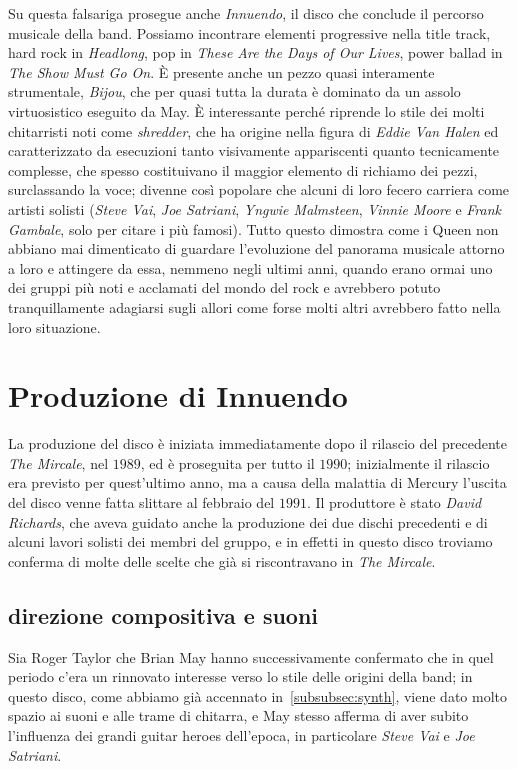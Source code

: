 \documentclass[12pt]{article}
\begin{document}
Su questa falsariga prosegue anche \emph{Innuendo}, il disco che conclude il percorso musicale della band. Possiamo incontrare elementi progressive nella title track, hard rock in \emph{Headlong}, pop in \emph{These Are the Days of Our Lives}, power ballad in \emph{The Show Must Go On}. È presente anche un pezzo quasi interamente strumentale, \emph{Bijou}, che per quasi tutta la durata è dominato da un assolo virtuosistico eseguito da May. È interessante perché riprende lo stile dei molti chitarristi noti come \emph{shredder}, che ha origine nella figura di \emph{Eddie Van Halen} ed caratterizzato da esecuzioni tanto visivamente appariscenti quanto tecnicamente complesse, che spesso costituivano il maggior elemento di richiamo dei pezzi, surclassando la voce; divenne così popolare che alcuni di loro fecero carriera come artisti solisti (\emph{Steve Vai}, \emph{Joe Satriani}, \emph{Yngwie Malmsteen}, \emph{Vinnie Moore} e \emph{Frank Gambale}, solo per citare i più famosi). Tutto questo dimostra come i Queen non abbiano mai dimenticato di guardare l'evoluzione del panorama musicale attorno a loro e attingere da essa, nemmeno negli ultimi anni, quando erano ormai uno dei gruppi più noti e acclamati del mondo del rock e avrebbero potuto tranquillamente adagiarsi sugli allori come forse molti altri avrebbero fatto nella loro situazione.

\section{Produzione di Innuendo}
La produzione del disco è iniziata immediatamente dopo il rilascio del precedente \emph{The Mircale}, nel \(1989\), ed è proseguita per tutto il \(1990\); inizialmente il rilascio era previsto per quest'ultimo anno, ma a causa della malattia di Mercury l'uscita del disco venne fatta slittare al febbraio del \(1991\). Il produttore è stato \emph{David Richards}, che aveva guidato anche la produzione dei due dischi precedenti e di alcuni lavori solisti dei membri del gruppo, e in effetti in questo disco troviamo conferma di molte delle scelte che già si riscontravano in \emph{The Mircale}.

\subsection{direzione compositiva e suoni}
Sia Roger Taylor che Brian May hanno successivamente confermato che in quel periodo c'era un rinnovato interesse verso lo stile delle origini della band; in questo disco, come abbiamo già accennato in~\ref{subsubsec:synth}, viene dato molto spazio ai suoni e alle trame di chitarra, e May stesso afferma di aver subito l'influenza dei grandi guitar heroes dell'epoca, in particolare \emph{Steve Vai} e \emph{Joe Satriani}.
\end{document}
